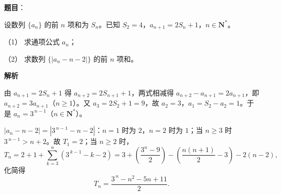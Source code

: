\begin{answer}

\textbf{题目}：

设数列 \(\{a_{n}\}\) 的前 \(n\) 项和为 \(S_{n}\)。已知 \(S_{2}=4\)，\(a_{n+1}=2S_{n}+1\)，\(n\in\mathbf{N}^{*}\)。

（1） 求通项公式 \(a_{n}\)；

（2） 求数列 \(\{|a_{n}-n-2|\}\) 的前 \(n\) 项和。

\textbf{解析}


由 \(a_{n+1}=2S_{n}+1\) 得 \(a_{n+2}=2S_{n+1}+1\)，两式相减得 \(a_{n+2}-a_{n+1}=2a_{n+1}\)，即 \(a_{n+2}=3a_{n+1}\)（\(n\geqslant1\)）。又 \(a_{3}=2S_{2}+1=9\)，故 \(a_{2}=3\)，\(a_{1}=S_{2}-a_{2}=1\)。于是 \(a_{n}=3^{\,n-1}\)（\(n\in\mathbf{N}^{*}\)）。


\(|a_{n}-n-2|=|3^{\,n-1}-n-2|\)：\(n=1\) 时为 \(2\)，\(n=2\) 时为 \(1\)；当 \(n\geqslant3\) 时 \(3^{\,n-1}>n+2\)。故 \(T_{1}=2\)；当 \(n\geqslant2\) 时，
\nopagebreak[4]
\[
T_{n}=2+1+\sum_{k=3}^{n}\left(3^{\,k-1}-k-2\right)
=3+\left(\frac{3^{n}-9}{2}\right)-\left(\frac{n(n+1)}{2}-3\right)-2(n-2),
\]
化简得
\nopagebreak[4]
\[
T_{n}=\frac{3^{\,n}-n^{2}-5n+11}{2}.
\]



\end{answer}

